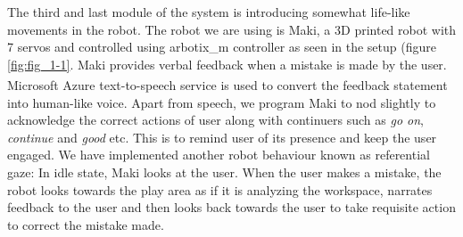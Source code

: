 The third and last module of the system is introducing somewhat life-like movements in the robot. The robot we are using is Maki, a 3D printed robot with 7 servos and controlled using arbotix\_m controller as seen in the setup (figure \ref{fig:fig_1-1}. Maki provides verbal feedback when a mistake is made by the user. Microsoft\textsuperscript\textregistered{} Azure text-to-speech service is used to convert the feedback statement into human-like voice. Apart from speech, we program Maki to nod slightly to acknowledge the correct actions of user along with continuers such as \emph{go on}, \emph{continue} and \emph{good} etc. This is to remind user of its presence and keep the user engaged. We have implemented another robot behaviour known as referential gaze: In idle state, Maki looks at the user. When the user makes a mistake, the robot looks towards the play area as if it is analyzing the workspace, narrates feedback to the user and then looks back towards the user to take requisite action to correct the mistake made.















